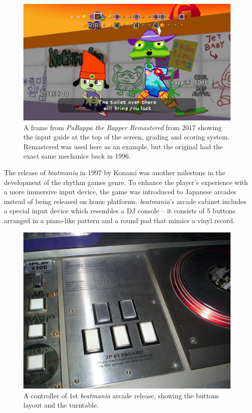 \begin{figure}[h]
    \centering\includegraphics[scale=0.23]{obrazki/parappatherapper.jpg}
    \caption{A frame from \textit{PaRappa the Rapper Remastered} from 2017 showing the input guide at the top of the screen, grading and scoring system. Remastered was used here as an example, but the original had the exact same mechanics back in 1996. \cite{parappatherapper}}
    \label{fig:parappa_the_rapper}
\end{figure}

The release of \textit{beatmania} in 1997 by Konami was another milestone in the development of the rhythm games genre. To enhance the player’s experience with a more immersive input device, the game was introduced to Japanese arcades instead of being released on home platforms. \textit{beatmania}’s arcade cabinet includes a special input device which resembles a DJ console -- it consists of 5 buttons arranged in a piano-like pattern and a round pad that mimics a vinyl record.

\begin{figure}[ht]
    \centering\includegraphics[scale=0.25]{obrazki/beatmaniacontrols.jpg}
    \caption{A controller of 1st \textit{beatmania} arcade release, showing the buttons layout and the turntable. \cite{beatmaniacontrols}}
    \label{fig:beatmania_controls}
\end{figure}

